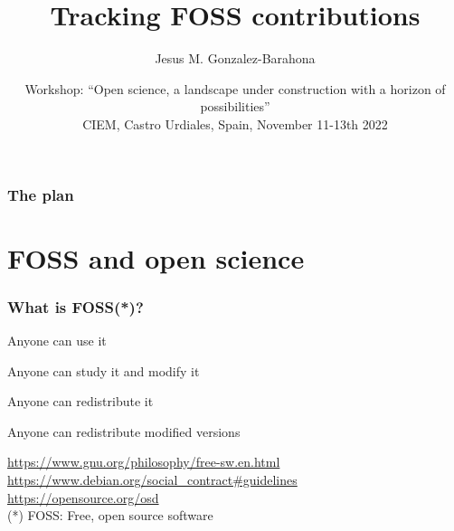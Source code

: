\documentclass[17pt,aspectratio=169,hyperref={pdfusetitle,colorlinks,allcolors=olive}]{beamer}
\title[Tracking FOSS contributions]{Tracking FOSS contributions}
\author[Jesus M. Gonzalez-Barahona]{Jesus M. Gonzalez-Barahona}
\institute[URJC]{Universidad Rey Juan Carlos \\
  \url{https://floss.social/@jgbarah} ~~~~~ \url{https://jgbarah.github.io/presentations}}
\date[Open Science Workshop, 2022]{\small Workshop: ``Open science, a landscape under construction with a horizon of possibilities'' \\
  CIEM, Castro Urdiales, Spain, November 11-13th 2022}
\begin{document}
\begin{frame}
  \maketitle
\end{frame}



\begin{frame}
  \frametitle{The plan}
\tableofcontents
\end{frame}

\section{FOSS and open science}


\begin{frame}[fragile]
  \frametitle{What is FOSS(*)?}

  Anyone can use it

  Anyone can study it and modify it

  Anyone can redistribute it

  Anyone can redistribute modified versions


  \begin{flushright}
    {\footnotesize
      \url{https://www.gnu.org/philosophy/free-sw.en.html} \\
      \url{https://www.debian.org/social_contract\#guidelines} \\ 
      \url{https://opensource.org/osd} \\
    (*) FOSS: Free, open source software \\
    }
  \end{flushright}

\end{frame}
\end{document}

